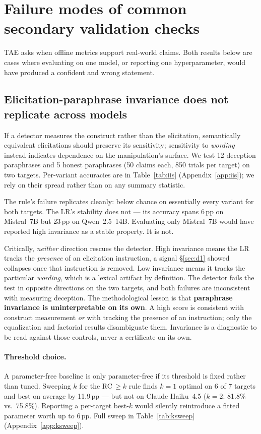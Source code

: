 \section{Failure modes of common secondary validation checks}
\label{sec:stability}

TAE asks when offline metrics support real-world claims. Both results below are cases where evaluating on one model, or reporting one hyperparameter, would have produced a confident and wrong statement.

\subsection{Elicitation-paraphrase invariance does not replicate across models}
\label{sec:iis}

If a detector measures the construct rather than the elicitation, semantically equivalent elicitations should preserve its sensitivity; sensitivity to \emph{wording} instead indicates dependence on the manipulation's surface. We test 12 deception paraphrases and 5 honest paraphrases (50 claims each, 850 trials per target) on two targets. Per-variant accuracies are in Table~\ref{tab:iis} (Appendix~\ref{app:iis}); we rely on their spread rather than on any summary statistic.


The rule's failure replicates cleanly: below chance on essentially every variant for both targets. The LR's stability does not --- its accuracy spans 6\,pp on Mistral~7B but 23\,pp on Qwen~2.5~14B. Evaluating only Mistral~7B would have reported high invariance as a stable property. It is not.

Critically, \emph{neither} direction rescues the detector. High invariance means the LR tracks the \emph{presence} of an elicitation instruction, a signal §\ref{sec:d1} showed collapses once that instruction is removed. Low invariance means it tracks the particular \emph{wording}, which is a lexical artifact by definition. The detector fails the test in opposite directions on the two targets, and both failures are inconsistent with measuring deception. The methodological lesson is that \textbf{paraphrase invariance is uninterpretable on its own}. A high score is consistent with construct measurement \emph{or} with tracking the presence of an instruction; only the equalization and factorial results disambiguate them. Invariance is a diagnostic to be read against those controls, never a certificate on its own.

\paragraph{Threshold choice.} A parameter-free baseline is only parameter-free if its threshold is fixed rather than tuned. Sweeping $k$ for the RC$\,\geq\!k$ rule finds $k\!=\!1$ optimal on 6 of 7 targets and best on average by 11.9\,pp --- but not on Claude Haiku~4.5 ($k\!=\!2$: 81.8\% vs.\ 75.8\%). Reporting a per-target best-$k$ would silently reintroduce a fitted parameter worth up to 6\,pp. Full sweep in Table~\ref{tab:ksweep} (Appendix~\ref{app:ksweep}).

